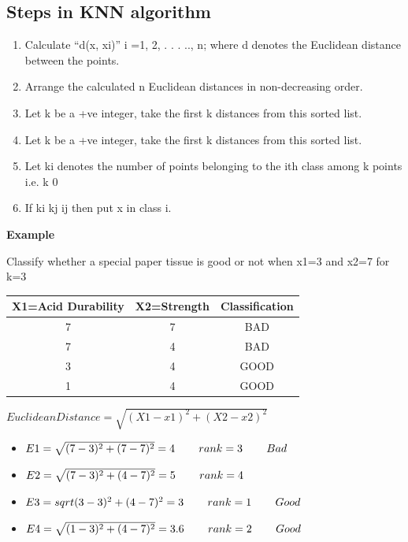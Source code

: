 \documentclass{report}
\begin{document}
\subsection{Steps in KNN algorithm} 
\begin{enumerate}
\item Calculate “d(x, xi)” i =1, 2, . . . .., n; where d denotes the Euclidean distance between the points.
 
\item Arrange the calculated n Euclidean distances in non-decreasing order.  
\item Let k be a +ve integer, take the first k distances from this sorted list.  
\item Let k be a +ve integer, take the first k distances from this sorted list.  
\item Let ki denotes the number of points belonging to the ith class among k points  i.e. k 0 
\item If ki kj ij then put x in class i.
\end{enumerate}

\textbf {Example}

Classify whether a special paper tissue is good or not when x1=3 and x2=7  for k=3

\begin{center}
\begin{tabular}{ |c|c|c| } 
 \hline
 X1=Acid Durability & X2=Strength & Classification \\ 
\hline
7  & 7 & BAD \\ 
\hline
 7 & 4 & BAD\\ 
 \hline
3 & 4 & GOOD\\ 
 \hline
1 & 4 & GOOD \\ 
 \hline
\end{tabular}
\end{center}

$Euclidean Distance=\sqrt{(X1-x1)^2+(X2-x2)^2}$
\\

\begin{itemize}
\item $ E1=\sqrt{(7-3)^2+(7-7)^2}=4    \hspace*{0.3in}        rank=3   \hspace*{0.3in}           Bad $
\item $E2=\sqrt{(7-3)^2+(4-7)^2}=5         \hspace*{0.3in}            rank=4 $
\item  $E3=sqrt{(3-3)^2+(4-7)^2}=3             \hspace*{0.3in}        rank=1        \hspace*{0.3in}        Good    $
\item  $E4=\sqrt{(1-3)^2+(4-7)^2}=3.6        \hspace*{0.3in}           rank=2       \hspace*{0.3in}          Good$
\end{itemize}
\end{document}
